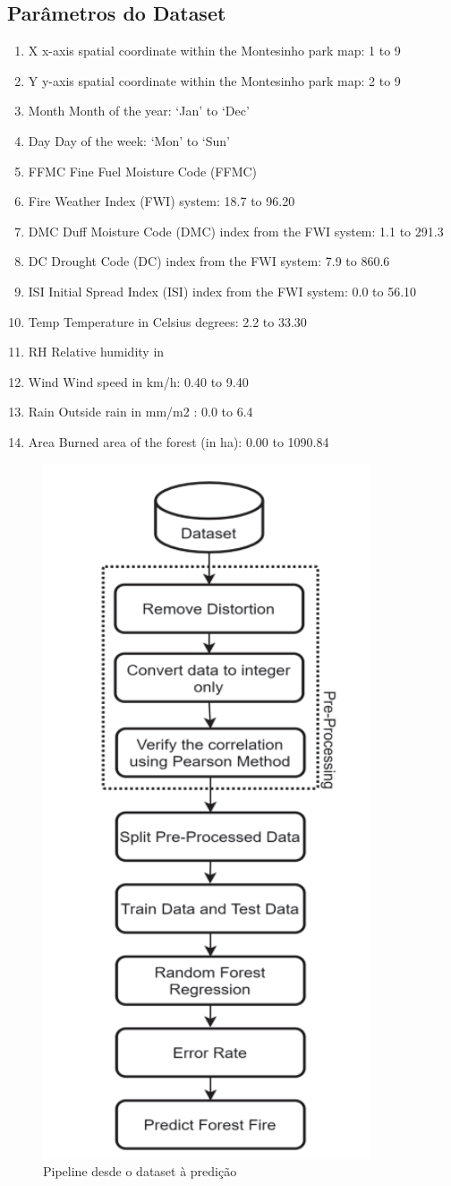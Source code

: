 \documentclass{article}
\begin{document}
\subsection{Parâmetros do Dataset}
\begin{enumerate}
    \item X x-axis spatial coordinate within the Montesinho park map: 1 to 9
    \item Y y-axis spatial coordinate within the Montesinho park map: 2 to 9
    \item Month Month of the year: ‘Jan’ to ‘Dec’
    \item Day Day of the week: ‘Mon’ to ‘Sun’
    \item FFMC Fine Fuel Moisture Code (FFMC)
    \item Fire Weather Index (FWI) system: 18.7 to 96.20
    \item DMC Duff Moisture Code (DMC) index from the FWI system: 1.1 to 291.3
    \item DC Drought Code (DC) index from the FWI system: 7.9 to 860.6
    \item ISI Initial Spread Index (ISI) index from the FWI system: 0.0 to 56.10
    \item Temp Temperature in Celsius degrees: 2.2 to 33.30
    \item RH Relative humidity in %
    \item Wind Wind speed in km/h: 0.40 to 9.40
    \item Rain Outside rain in mm/m2 : 0.0 to 6.4
    \item Area Burned area of the forest (in ha): 0.00 to 1090.84
\end{enumerate}


\begin{figure}[H]
 \centering
  \includegraphics[width=0.25\linewidth]{imgs/flow_chart_detect_fire.png}
   \caption{\label{fig:flow_chaft}Pipeline desde o dataset à predição}
\end{figure}
\end{document}
